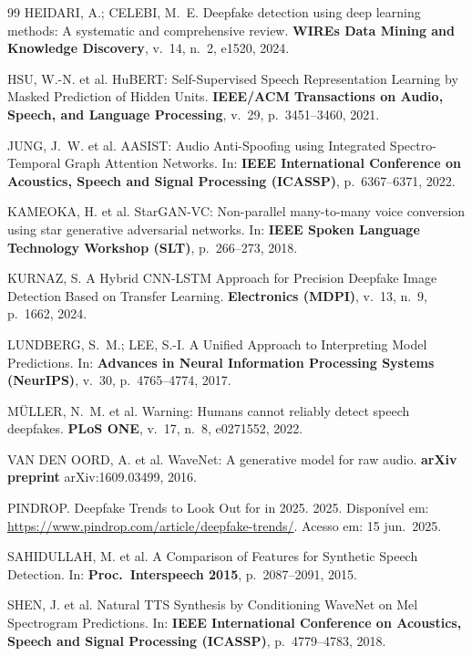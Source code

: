 \documentclass[12pt,a4paper]{article}
\begin{document}
\begin{thebibliography}{99}
HEIDARI, A.; CELEBI, M.~E.
Deepfake detection using deep learning methods: A systematic and comprehensive
review.
\textbf{WIREs Data Mining and Knowledge Discovery},
v.~14, n.~2, e1520, 2024.

HSU, W.-N. et al.
HuBERT: Self-Supervised Speech Representation Learning by Masked Prediction
of Hidden Units.
\textbf{IEEE/ACM Transactions on Audio, Speech, and Language Processing},
v.~29, p.~3451--3460, 2021.

JUNG, J.~W. et al.
AASIST: Audio Anti-Spoofing using Integrated Spectro-Temporal Graph Attention
Networks.
In: \textbf{IEEE International Conference on Acoustics, Speech and Signal
Processing (ICASSP)}, p.~6367--6371, 2022.

KAMEOKA, H. et al.
StarGAN-VC: Non-parallel many-to-many voice conversion using star generative
adversarial networks.
In: \textbf{IEEE Spoken Language Technology Workshop (SLT)},
p.~266--273, 2018.

KURNAZ, S.
A Hybrid CNN-LSTM Approach for Precision Deepfake Image Detection Based on
Transfer Learning.
\textbf{Electronics (MDPI)},
v.~13, n.~9, p.~1662, 2024.

LUNDBERG, S.~M.; LEE, S.-I.
A Unified Approach to Interpreting Model Predictions.
In: \textbf{Advances in Neural Information Processing Systems (NeurIPS)},
v.~30, p.~4765--4774, 2017.

M\"{U}LLER, N.~M. et al.
Warning: Humans cannot reliably detect speech deepfakes.
\textbf{PLoS ONE},
v.~17, n.~8, e0271552, 2022.

VAN DEN OORD, A. et al.
WaveNet: A generative model for raw audio.
\textbf{arXiv preprint} arXiv:1609.03499, 2016.

PINDROP.
Deepfake Trends to Look Out for in 2025.
2025.
Dispon\'{i}vel em: \url{https://www.pindrop.com/article/deepfake-trends/}.
Acesso em: 15 jun.\ 2025.

SAHIDULLAH, M. et al.
A Comparison of Features for Synthetic Speech Detection.
In: \textbf{Proc.\ Interspeech 2015}, p.~2087--2091, 2015.

SHEN, J. et al.
Natural TTS Synthesis by Conditioning WaveNet on Mel Spectrogram Predictions.
In: \textbf{IEEE International Conference on Acoustics, Speech and Signal
Processing (ICASSP)}, p.~4779--4783, 2018.


\end{thebibliography}
\end{document}
